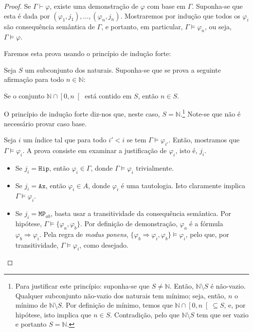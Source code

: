 \documentclass{report}
\theoremstyle{definition}
\theoremstyle{remark}
\newcommand{\N}{\mathbb{N}}
\newcommand{\imply}{\mathbin{\Rightarrow}}
\begin{document}
	\begin{proof}
	Se $\Gamma \vdash \varphi$, existe uma demonstração de $\varphi$ com base em $\Gamma$. Suponha-se que esta é dada por $(\varphi_1, j_1), \dots, (\varphi_n, j_n)$. Mostraremos por indução que todos os $\varphi_i$ são consequência semântica de $\Gamma$, e portanto, em particular, $\Gamma \vDash \varphi_n$, ou seja, $\Gamma \vDash \varphi$.
	
	Faremos esta prova usando o princípio de indução forte:
	
	\begin{center}
	Seja $S$ um subconjunto dos naturais. Suponha-se que se prova a seguinte afirmação para todo $n \in \N$:
	
	Se o conjunto $\N \cap \left[0,n\right[$ está contido em $S$, então $n \in S$.
	
	O princípio de indução forte diz-nos que, neste caso, $S = \N$.\footnote{Para justificar este princípio: suponha-se que $S \neq \N$. Então, $\N \setminus S$ é não-vazio. Qualquer subconjunto não-vazio dos naturais tem mínimo; seja, então, $n$ o mínimo de $\N \setminus S$. Por definição de mínimo, temos que $\N \cap \left[0, n\right[ \subseteq S$, e, por hipótese, isto implica que $n \in S$. Contradição, pelo que $\N \setminus S$ tem que ser vazio e portanto $S = \N$.} Note-se que não é necessário provar caso base.
	\end{center}
	
	Seja $i$ um índice tal que para todo $i' < i$ se tem $\Gamma \vDash \varphi_{i'}$. Então, mostramos que $\Gamma \vDash \varphi_i$. A prova consiste em examinar a justificação de $\varphi_i$, isto é, $j_i$.
	
	\begin{itemize}
	\item Se $j_i = \texttt{Hip}$, então $\varphi_i \in \Gamma$, donde $\Gamma \vDash \varphi_i$ trivialmente.
	
	\item Se $j_i = \texttt{Ax}$, então $\varphi_i \in A$, donde $\varphi_i$ é uma tautologia. Isto claramente implica $\Gamma\vDash\varphi_i$.
	
	\item Se $j_i = \texttt{MP}_{ab}$, basta usar a transitividade da consequência semântica. Por hipótese, $\Gamma \vDash \{\varphi_a, \varphi_b\}$. Por definição de demonstração, $\varphi_a$ é a fórmula $\varphi_b \imply \varphi_i$. Pela regra de \textit{modus ponens}, $\{\varphi_b \imply \varphi_i, \varphi_b\} \vDash \varphi_i$, pelo que, por transitividade, $\Gamma \vDash \varphi_i$, como desejado.
	\end{itemize}
	\end{proof}
	
\end{document}
